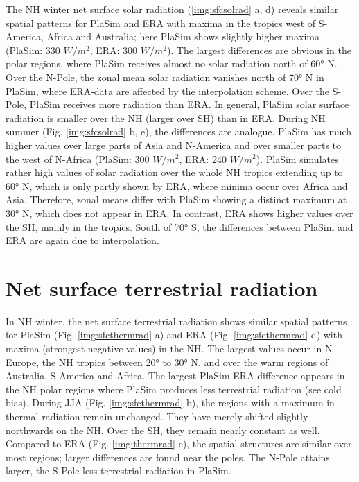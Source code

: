 \documentclass[12pt,a4paper,twoside,openright,headinclude,liststotoc,bibtotoc]{scrreprt}
\begin{document}
The NH winter net surface solar radiation (\ref{img:sfcsolrad} a, d) reveals similar spatial patterns for PlaSim and ERA with maxima in the tropics west of S-America, Africa and Australia; here PlaSim shows slightly higher maxima (PlaSim: 330 $W/m^2$, ERA: 300 $W/m^2$). The largest differences are obvious in the polar regions, where PlaSim receives almost no solar radiation north of 60° N. Over the N-Pole, the zonal mean solar radiation vanishes north of 70° N in PlaSim, where ERA-data are affected by the interpolation scheme. Over the S-Pole, PlaSim receives more radiation than ERA. In general, PlaSim solar surface radiation is smaller over the NH (larger over SH) than in ERA. During NH summer (Fig. \ref{img:sfcsolrad} b, e), the differences are analogue. PlaSim has much higher values over large parts of Asia and N-America and over smaller parts to the west of N-Africa (PlaSim: 300 $W/m^2$, ERA: 240 $W/m^2$). PlaSim simulates rather high values of solar radiation over the whole NH tropics extending up to 60° N, which is only partly shown by ERA, where minima occur over Africa and Asia. Therefore, zonal means differ with PlaSim showing a distinct maximum at 30° N, which does not appear in ERA. In contrast, ERA shows higher values over the SH, mainly in the tropics. South of 70° S, the differences between PlaSim and ERA are again due to interpolation.

\vspace{-0.4cm}
\section{Net surface terrestrial radiation}
\vspace{-0.4cm}

In NH winter, the net surface terrestrial radiation shows similar spatial patterns for PlaSim (Fig. \ref{img:sfcthermrad} a) and ERA (Fig. \ref{img:sfcthermrad} d) with maxima (strongest negative values) in the NH. The largest values occur in N-Europe, the NH tropics between 20° to 30° N, and over the warm regions of Australia, S-America and Africa. The largest PlaSim-ERA difference appears in the NH polar regions where PlaSim produces less terrestrial radiation (see cold bias). During JJA (Fig. \ref{img:sfcthermrad} b), the regions with a maximum in thermal radiation remain unchanged. They have merely shifted slightly northwards on the NH. Over the SH, they remain nearly constant as well. Compared to ERA (Fig. \ref{img:thermrad} e), the spatial structures are similar over most regions; larger differences are found near the poles. The N-Pole attains larger, the S-Pole less terrestrial radiation in PlaSim.
\end{document}
